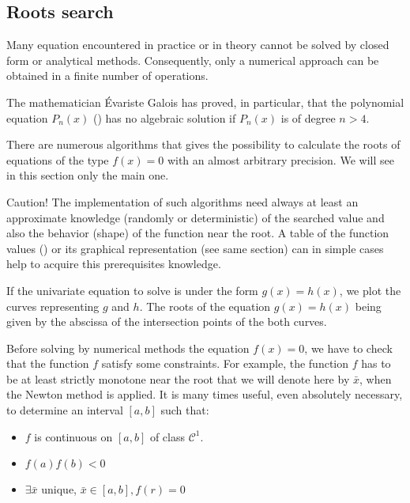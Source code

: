 	\subsection{Roots search}
	Many equation encountered in practice or in theory cannot be solved by closed form or analytical methods. Consequently, only a numerical approach can be obtained in a finite number of operations.

	The mathematician Évariste Galois has proved, in particular, that the polynomial equation $P_n(x)$ () has no algebraic solution if $P_n(x)$ is of degree $n>4$.

	There are numerous algorithms that gives the possibility to calculate the roots of equations of the type $f(x)=0$ with an almost arbitrary precision. We will see in this section only the main one.

	Caution! The implementation of such algorithms need always at least an approximate knowledge (randomly or deterministic) of the searched value and also the behavior (shape) of the function near the root. A table of the function values () or its graphical representation (see same section) can in simple cases help to acquire this prerequisites knowledge.
	
	If the univariate equation to solve is under the form $g(x)=h(x)$, we plot the curves representing $g$ and $h$. The roots of the equation $g(x)=h(x)$ being given by the abscissa of the intersection points of the both curves.
	
	\begin{tcolorbox}[title=Remark,colframe=black,arc=10pt]
	Before solving by numerical methods the equation $f(x)=0$, we have to check that the function $f$ satisfy some constraints. For example, the function $f$ has to be at least strictly monotone near the root that we will denote here by $\bar{x}$, when the Newton method is applied. It is many times useful, even absolutely necessary, to determine an interval $[a,b]$ such that:
	\begin{itemize}
		\item $f$ is continuous on $[a,b]$ of class $\mathcal{C}^1$.

		\item $f(a)f(b)<0$
		
		\item $\exists \bar{x}$ unique, $\bar{x}\in [a,b],f(r)=0$
	\end{itemize}
	\end{tcolorbox}

